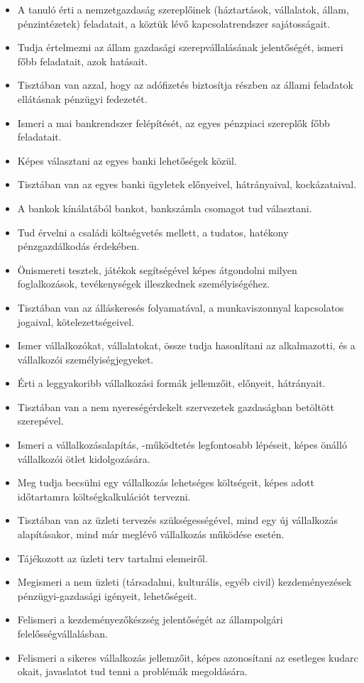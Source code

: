 \begin{itemize}
\tightlist
\item
  A tanuló érti a nemzetgazdaság szereplőinek (háztartások, vállalatok,
  állam, pénzintézetek) feladatait, a köztük lévő kapcsolatrendszer
  sajátosságait.
\item
  Tudja értelmezni az állam gazdasági szerepvállalásának jelentőségét,
  ismeri főbb feladatait, azok hatásait.
\item
  Tisztában van azzal, hogy az adófizetés biztosítja részben az állami
  feladatok ellátásnak pénzügyi fedezetét.
\item
  Ismeri a mai bankrendszer felépítését, az egyes pénzpiaci szereplők
  főbb feladatait.
\item
  Képes választani az egyes banki lehetőségek közül.
\item
  Tisztában van az egyes banki ügyletek előnyeivel, hátrányaival,
  kockázataival.
\item
  A bankok kínálatából bankot, bankszámla csomagot tud választani.
\item
  Tud érvelni a családi költségvetés mellett, a tudatos, hatékony
  pénzgazdálkodás érdekében.
\item
  Önismereti tesztek, játékok segítségével képes átgondolni milyen
  foglalkozások, tevékenységek illeszkednek személyiségéhez.
\item
  Tisztában van az álláskeresés folyamatával, a munkaviszonnyal
  kapcsolatos jogaival, kötelezettségeivel.
\item
  Ismer vállalkozókat, vállalatokat, össze tudja hasonlítani az
  alkalmazotti, és a vállalkozói személyiségjegyeket.
\item
  Érti a leggyakoribb vállalkozási formák jellemzőit, előnyeit,
  hátrányait.
\item
  Tisztában van a nem nyereségérdekelt szervezetek gazdaságban betöltött
  szerepével.
\item
  Ismeri a vállalkozásalapítás, -működtetés legfontosabb lépéseit, képes
  önálló vállalkozói ötlet kidolgozására.
\item
  Meg tudja becsülni egy vállalkozás lehetséges költségeit, képes adott
  időtartamra költségkalkulációt tervezni.
\item
  Tisztában van az üzleti tervezés szükségességével, mind egy új
  vállalkozás alapításakor, mind már meglévő vállalkozás működése
  esetén.
\item
  Tájékozott az üzleti terv tartalmi elemeiről.
\item
  Megismeri a nem üzleti (társadalmi, kulturális, egyéb civil)
  kezdeményezések pénzügyi-gazdasági igényeit, lehetőségeit.
\item
  Felismeri a kezdeményezőkészség jelentőségét az állampolgári
  felelősségvállalásban.
\item
  Felismeri a sikeres vállalkozás jellemzőit, képes azonosítani az
  esetleges kudarc okait, javaslatot tud tenni a problémák megoldására.
\end{itemize}

